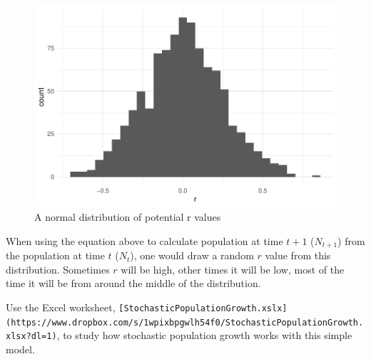 \documentclass[
  a4paper]{book}
\begin{document}
\begin{figure}

{\centering \includegraphics{BB512_files/figure-latex/stochGrowthRate-1} 

}

\caption{A normal distribution of potential r values}\label{fig:stochGrowthRate}
\end{figure}

When using the equation above to calculate population at time \(t+1\)
(\(N_{t+1}\)) from the population at time \(t\) (\(N_t\)), one would
draw a random \(r\) value from this distribution. Sometimes \(r\) will
be high, other times it will be low, most of the time it will be from
around the middle of the distribution.

\begin{do-something}
Use the Excel worksheet,
\texttt{{[}StochasticPopulationGrowth.xslx{]}(https://www.dropbox.com/s/1wpixbpgwlh54f0/StochasticPopulationGrowth.xlsx?dl=1)},
to study how stochastic population growth works with this simple model.
\end{do-something}
\end{document}

